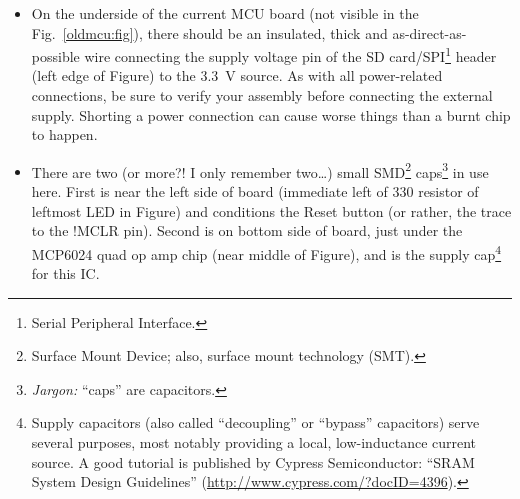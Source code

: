 \documentclass[letterpaper]{article}
\begin{document}
\begin{itemize}
\begin{enumerate}
    \item place a small diameter piece of heat-shrink
      tubing\footnote{insulating tubing that shrinks (hence,
        tightening, fitting snugly) in response to hot air.} over the
      floating leg of the pull-down resistor\footnote{the goal with
        insulation here is to prevent unintentional electrical
        contact.}; and

    \item solder the exposed leg end to the ground lead (bottom-left
      pin in the Figure) of the 3.3~V regulator.
  \end{enumerate}
  Now the trigger-detecting pin of the dsPIC33F is pulled to ground
  (i.e. ``GND'' or 0~V) until a trigger signal arrives, which drives
  the pin high briefly.\footnote{\textit{Design note:} pulling nodes
    down or up is way to stabilize their value and facilitate bus
    communications, among other things. Here we use it to ensure the
    dsPIC33F firmware will, in the absense of a signal, not see any
    jitter on the trigger line.}

\item On the underside of the current MCU board (not visible in the
  Fig.~\ref{oldmcu:fig}), there should be an insulated, thick and
  as-direct-as-possible wire connecting the supply voltage pin of the
  SD card/SPI\footnote{Serial Peripheral Interface.} header (left edge
  of Figure) to the 3.3~V source. As with all power-related
  connections, be sure to verify your assembly before connecting the
  external supply. Shorting a power connection can cause worse things
  than a burnt chip to happen.

\item There are two (or more?! I only remember two\ldots) small
  SMD\footnote{Surface Mount Device; also, surface mount technology
    (SMT).} caps\footnote{\textit{Jargon:} ``caps'' are capacitors.}
  in use here. First is near the left side of board (immediate left of
  330 resistor of leftmost LED in Figure) and conditions the Reset
  button (or rather, the trace to the !MCLR pin). Second is on bottom
  side of board, just under the MCP6024 quad op amp chip (near middle
  of Figure), and is the supply cap\footnote{Supply capacitors (also
    called ``decoupling'' or ``bypass'' capacitors) serve several
    purposes, most notably providing a local, low-inductance current
    source. A good tutorial is published by Cypress Semiconductor:
    ``SRAM System Design Guidelines''
    (\url{http://www.cypress.com/?docID=4396}).} for this IC.
\end{itemize}
\end{document}
